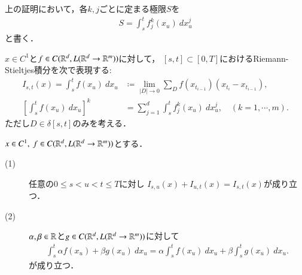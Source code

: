上の証明において，各$k,j$ごとに定まる極限$S$を
\begin{align}
	S = \int_s^t f^k_j(x_u)\ dx^j_u
\end{align}
と書く．

\begin{screen}
	\begin{dfn}[$C^1$-級のパスに対する汎関数]
		$x \in C^1$と$f \in C(\mathbb{R}^d,L(\mathbb{R}^d \rightarrow \mathbb{R}^m))$に対して，
		$[s,t] \subset [0,T]$におけるRiemann-Stieltjes積分を次で表現する:
		\begin{align}
			I_{s,t}(x) = \int_s^t f(x_u)\ dx_u 
			&\coloneqq \lim_{|D| \to 0}
				\sum_{D} f(x_{t_{i-1}})(x_{t_i} - x_{t_{i-1}}), \\
			\left[ \int_s^t f(x_u)\ dx_u \right]^k
			&= \sum_{j=1}^d \int_s^t f^k_j(x_u)\ dx^j_u,
			\quad (k = 1,\cdots,m).
		\end{align}
		ただし$D \in \delta[s,t]$のみを考える．
	\end{dfn}
\end{screen}

\begin{screen}
	\begin{thm}
	\label{thm:linearity_of_Riemann_Stieltjes_integral}
		$x \in C^1,\ f \in C(\mathbb{R}^d,L(\mathbb{R}^d \rightarrow \mathbb{R}^m))$とする．
		\begin{description}
			\item[(1)] 任意の$0 \leq s < u < t \leq T$に対し
				$I_{s,u}(x) + I_{u,t}(x) = I_{s,t}(x)$が成り立つ．
				
			\item[(2)] $\alpha,\beta \in \mathbb{R}$と$g \in C(\mathbb{R}^d,L(\mathbb{R}^d \rightarrow \mathbb{R}^m))$に対して
				\begin{align}
					\int_s^t \alpha f(x_u) + \beta g(x_u)\ dx_u
					= \alpha \int_s^t f(x_u)\ dx_u + \beta \int_s^t g(x_u)\ dx_u.
				\end{align}
				が成り立つ．
		\end{description}
	\end{thm}
\end{screen}

